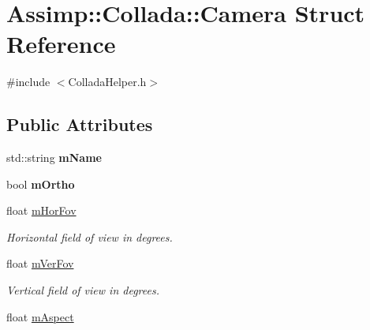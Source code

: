 \hypertarget{struct_assimp_1_1_collada_1_1_camera}{\section{Assimp\+:\+:Collada\+:\+:Camera Struct Reference}
\label{struct_assimp_1_1_collada_1_1_camera}
}


{\ttfamily \#include $<$Collada\+Helper.\+h$>$}

\subsection*{Public Attributes}
\begin{DoxyCompactItemize}
\item 
\hypertarget{struct_assimp_1_1_collada_1_1_camera_a02171b3141a5ed9395469362205728e3}{std\+::string {\bfseries m\+Name}}\label{struct_assimp_1_1_collada_1_1_camera_a02171b3141a5ed9395469362205728e3}

\item 
\hypertarget{struct_assimp_1_1_collada_1_1_camera_a3bc56e1d9efed97bb3b8a829d249890c}{bool {\bfseries m\+Ortho}}\label{struct_assimp_1_1_collada_1_1_camera_a3bc56e1d9efed97bb3b8a829d249890c}

\item 
\hypertarget{struct_assimp_1_1_collada_1_1_camera_a36af69151c2897423dbfd4c42c239832}{float \hyperlink{struct_assimp_1_1_collada_1_1_camera_a36af69151c2897423dbfd4c42c239832}{m\+Hor\+Fov}}\label{struct_assimp_1_1_collada_1_1_camera_a36af69151c2897423dbfd4c42c239832}

\begin{DoxyCompactList}\small\item\em Horizontal field of view in degrees. \end{DoxyCompactList}\item 
\hypertarget{struct_assimp_1_1_collada_1_1_camera_a372281ac64cd42128938791af72e76ff}{float \hyperlink{struct_assimp_1_1_collada_1_1_camera_a372281ac64cd42128938791af72e76ff}{m\+Ver\+Fov}}\label{struct_assimp_1_1_collada_1_1_camera_a372281ac64cd42128938791af72e76ff}

\begin{DoxyCompactList}\small\item\em Vertical field of view in degrees. \end{DoxyCompactList}\item 
\hypertarget{struct_assimp_1_1_collada_1_1_camera_a150da7f20122568dd0b38e0608c5b58a}{float \hyperlink{struct_assimp_1_1_collada_1_1_camera_a150da7f20122568dd0b38e0608c5b58a}{m\+Aspect}}\label{struct_assimp_1_1_collada_1_1_camera_a150da7f20122568dd0b38e0608c5b58a}


\end{DoxyCompactItemize}
